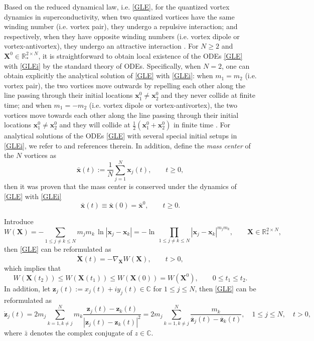 \documentclass{aims}
\theoremstyle{plain}
\theoremstyle{definition}
\newcommand{\bx}{{\mathbf x}}
\newcommand{\bX}{{\mathbf X}}
\newcommand{\be} {\begin{equation}}
\newcommand{\ee}{\end{equation}}
\begin{document}
Based on the reduced dynamical law, i.e. \eqref{GLE}, for
the quantized vortex dynamics in superconductivity, when two quantized
vortices have the same winding number (i.e. vortex pair), they undergo a
repulsive interaction; and respectively, when they have opposite winding numbers (i.e. vortex dipole or vortex-antivortex), they undergo an attractive interaction \cite{Neu2,Zhang1,Zhang2}. For $N\ge2$ and $\bX^0\in {\mathbb R}_*^{2\times N}$, it is straightforward to obtain local existence
of the ODEs \eqref{GLE} with \eqref{GLEi} by the standard theory of ODEs.
Specifically, when $N=2$, one can obtain explicitly the
analytical solution of \eqref{GLE} with \eqref{GLEi}: when $m_1=m_2$ (i.e. vortex pair),
the two vortices move outwards by repelling each other
along the line passing through their initial locations $\bx_1^0\ne \bx_2^0$ and they never collide at finite time; and when $m_1=-m_2$ (i.e. vortex dipole or vortex-antivortex), the two vortices move towards each other
along the line passing through their initial locations $\bx_1^0\ne \bx_2^0$ and they will collide at $\frac{1}{2}\left(\bx_1^0+\bx_2^0\right)$ in finite time \cite{Neu2,Zhang1,Zhang2}. For analytical solutions of the ODEs
\eqref{GLE} with several special initial setups in \eqref{GLEi},
we refer to \cite{Zhang1,Zhang2} and references therein.
In addition, define the {\sl mass center} of the $N$ vortices as
\be
\bar{\bx}(t):=\frac{1}{N}\sum_{j=1}^N \bx_j(t), \qquad t\ge0,
\ee
then it was proven that the mass center is conserved under the dynamics
of \eqref{GLE} with \eqref{GLEi} \cite{Zhang1,Zhang2}
\be \label{mccon1}
\bar{\bx}(t)\equiv \bar{\bx}(0)
=\bar{\bx}^0,%
\qquad t\ge0.
\ee

Introduce
\be
W({\mathbf X})=-\sum_{1\le j\ne k\le N}m_jm_k\, \ln |{\mathbf x}_j-{\mathbf x}_k|=-\ln\, \displaystyle\prod_{1\le j\ne k\le N}|{\mathbf x}_j-{\mathbf x}_k|^{m_jm_k}, \qquad
{\mathbf X}\in {\mathbb R}_*^{2\times N},\ee
then \eqref{GLE} can be reformulated as
\be\label{GLEv}
\dot{\mathbf{X}}(t)=-\nabla_{\mathbf{X}}W({\mathbf X}),
\qquad  t>0,
\ee
which implies that
\be
W({\mathbf X}(t_2))\le W({\mathbf X}(t_1))\le W({\mathbf X}(0))=W({\mathbf X}^0), \qquad 0\le t_1\le t_2.
\ee
In addition, let ${\mathbf z}_j(t):=x_j(t)+iy_j(t)\in {\mathbb C}$ for $1\le j\le N$, then
\eqref{GLE} can be reformulated as
\be\label{GLEc}
\dot{\mathbf{z}}_j(t)=2m_j\displaystyle\sum_{k=1,k\neq
j}^{N}m_k\frac{\mathbf{z}_j(t)-\mathbf{z}_k(t)}{\left|
\mathbf{z}_j(t)-\mathbf{z}_k(t)\right|^2}=2m_j\displaystyle\sum_{k=1,k\neq
j}^{N}\frac{m_k}{\overline{\mathbf{z}}_j(t)-\overline{\mathbf{z}}_k(t)},\quad 1\le j\le N,
\quad t>0,
\ee
where $\bar{z}$ denotes the complex conjugate of $z\in {\mathbb C}$.
\end{document}
